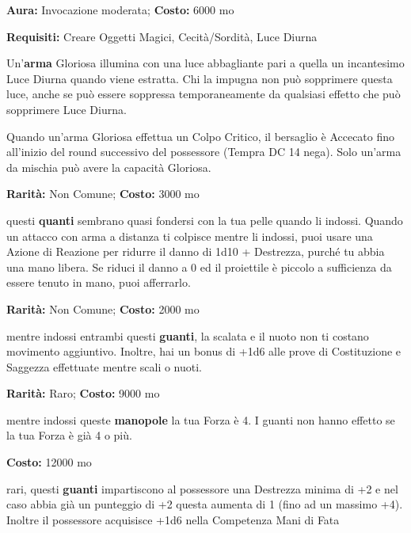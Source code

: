 \begin{multicols}{2}

\textbf{Aura:} Invocazione moderata; \textbf{Costo:} 6000 mo

\textbf{Requisiti:} Creare Oggetti Magici, Cecità/Sordità, Luce Diurna

Un'\textbf{arma} Gloriosa illumina con una luce abbagliante pari a quella un incantesimo Luce Diurna quando viene estratta. Chi la impugna non può sopprimere questa luce, anche se può essere soppressa temporaneamente da qualsiasi effetto che può sopprimere Luce Diurna.

Quando un'arma Gloriosa effettua un Colpo Critico, il bersaglio è Accecato fino all'inizio del round successivo del possessore (Tempra DC 14 nega). Solo un'arma da mischia può avere la capacità Gloriosa.


\textbf{Rarità:} Non Comune; \textbf{Costo:} 3000 mo

questi \textbf{quanti} sembrano quasi fondersi con la tua pelle quando li indossi. Quando un attacco con arma a distanza ti colpisce mentre li indossi, puoi usare una Azione di Reazione per ridurre il danno di 1d10 + Destrezza, purché tu abbia una mano libera. Se riduci il danno a 0 ed il proiettile è piccolo a sufficienza da essere tenuto in mano, puoi afferrarlo.


\textbf{Rarità:} Non Comune; \textbf{Costo:} 2000 mo

mentre indossi entrambi questi \textbf{guanti}, la scalata e il nuoto non ti costano movimento aggiuntivo. Inoltre, hai un bonus di +1d6 alle prove di Costituzione e Saggezza effettuate mentre scali o nuoti.


\textbf{Rarità:} Raro; \textbf{Costo:} 9000 mo

mentre indossi queste \textbf{manopole} la tua Forza è 4. I guanti non hanno effetto se la tua Forza è già 4 o più.


\textbf{Costo:} 12000 mo

rari, questi \textbf{guanti} impartiscono al possessore una Destrezza minima di +2 e nel caso abbia già un punteggio di +2 questa aumenta di 1 (fino ad un massimo +4). Inoltre il possessore acquisisce +1d6 nella Competenza Mani di Fata


\end{multicols}
